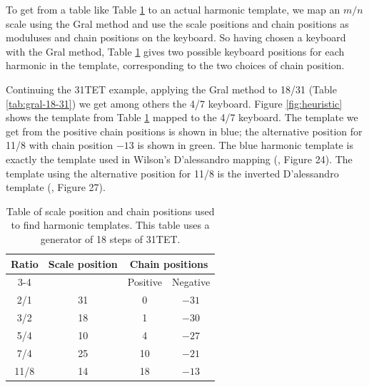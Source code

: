 \documentclass[a4paper,11pt]{article}
\begin{document}
To get from a table like Table \ref{table:template} to an actual harmonic
template, we map an $m/n$ scale using the Gral method and use the scale
positions and chain positions as moduluses and chain positions on the keyboard.
So having chosen a keyboard with the Gral method, Table \ref{table:template}
gives two possible keyboard positions for each harmonic in the template,
corresponding to the two choices of chain position.

Continuing the 31TET example, applying the Gral method to 18/31 (Table
\ref{tab:gral-18-31}) we get among others the 4/7 keyboard. Figure
\ref{fig:heuristic} shows the template from Table \ref{table:template} mapped
to the 4/7 keyboard. The template we get from the positive chain positions is
shown in blue; the alternative position for 11/8 with chain position $-13$ is
shown in green. The blue harmonic template is exactly the template used in
Wilson's D'alessandro mapping (\cite{wilson1989dal}, Figure 24). The template
using the alternative position for 11/8 is the inverted D'alessandro template
(\cite{wilson1989dal}, Figure 27).

\begin{table}
\begin{center}
\begin{tabular}{cccc}
\toprule
Ratio   &   Scale position  &   \multicolumn{2}{c}{Chain positions} \\
\cmidrule{3-4}
        &                   &   Positive    &   Negative    \\
\midrule
2/1     &   31              &   0   &   $-31$   \\
3/2     &   18              &   1   &   $-30$   \\
5/4     &   10              &   4   &   $-27$   \\
7/4     &   25              &   10  &   $-21$   \\
11/8    &   14              &   18  &   $-13$   \\
\bottomrule
\end{tabular}
\end{center}
\vspace{-0.25cm}
\caption{Table of scale position and chain positions used to find harmonic
templates. This table uses a generator of 18 steps of 31TET.\vspace{0.7cm}}
\label{table:template}
\end{table}
\end{document}
